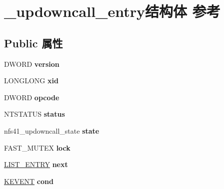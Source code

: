 \hypertarget{struct__updowncall__entry}{}\section{\+\_\+updowncall\+\_\+entry结构体 参考}
\label{struct__updowncall__entry}
\subsection*{Public 属性}
\begin{DoxyCompactItemize}
\item 
\mbox{\label{struct__updowncall__entry_a2c2b079e922f0c67e885664b3e9085a2}} 
D\+W\+O\+RD {\bfseries version}
\item 
\mbox{\label{struct__updowncall__entry_a3898768cfbe43c0e1c7baacc9bc3fc74}} 
L\+O\+N\+G\+L\+O\+NG {\bfseries xid}
\item 
\mbox{\label{struct__updowncall__entry_acd9eea4266a0bae5f723527571fb0332}} 
D\+W\+O\+RD {\bfseries opcode}
\item 
\mbox{\label{struct__updowncall__entry_a2074e81eccddac052488ebbe4134abe7}} 
N\+T\+S\+T\+A\+T\+US {\bfseries status}
\item 
\mbox{\label{struct__updowncall__entry_a85daa54710af95552d852b9b9da3b486}} 
nfs41\+\_\+updowncall\+\_\+state {\bfseries state}
\item 
\mbox{\label{struct__updowncall__entry_ac657fea4769ba749141215b4ff2b968a}} 
F\+A\+S\+T\+\_\+\+M\+U\+T\+EX {\bfseries lock}
\item 
\mbox{\label{struct__updowncall__entry_a2429ba9d0a4d2fb7c0567ea771cad0d5}} 
\hyperlink{struct___l_i_s_t___e_n_t_r_y}{L\+I\+S\+T\+\_\+\+E\+N\+T\+RY} {\bfseries next}
\item 
\mbox{\label{struct__updowncall__entry_a1beefbd776f640ed792bc1ab5ff9f5b8}} 
\hyperlink{struct___k_e_v_e_n_t}{K\+E\+V\+E\+NT} {\bfseries cond}
\item 

\end{DoxyCompactItemize}
